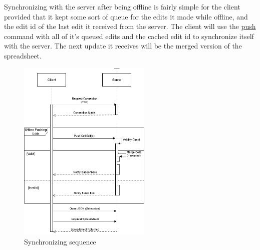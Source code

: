 Synchronizing with the server after being offline is fairly simple for the client provided that it kept some sort of queue for the edits it made while offline, and the edit id of the last edit it received from the server. The client will use the \hyperref[sec:message:push]{push} command with all of it’s queued edits and the cached edit id to synchronize itself with the server. The next update it receives will be the merged version of the spreadsheet.

\begin{figure}[H]
    \begin{center}
        \includegraphics[width=2.5in]{Figures/OfflineWithEdits.png}
        \caption{Synchronizing sequence}
    \end{center}
\end{figure}